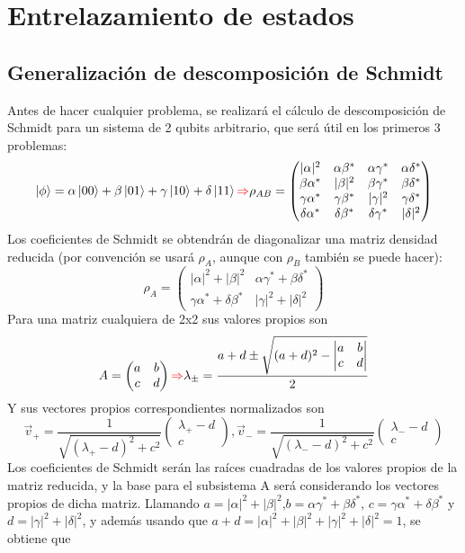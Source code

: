 \documentclass{book}
\begin{document}
\section{Entrelazamiento de estados}
\subsection{Generalización de descomposición de Schmidt}
Antes de hacer cualquier problema, se realizará el cálculo de descomposición de Schmidt para un sistema de 2 qubits arbitrario, que será útil en los primeros 3 problemas:
$$\ket{\phi}=\alpha\ket{00}+\beta\ket{01}+\gamma\ket{10}+\delta\ket{11}\textcolor{red}{\Rightarrow} \rho_{AB}=\begin{pmatrix}\lvert\alpha\rvert^2 &\alpha\beta^* &\alpha\gamma^*&\alpha\delta^*\\ \beta\alpha^*&\lvert\beta\rvert^2 &\beta\gamma^* &\beta\delta^*\\ \gamma\alpha^*&\gamma\beta^*&\lvert\gamma\rvert^2& \gamma\delta^*\\ \delta\alpha^*&\delta\beta^*&\delta\gamma^*& \lvert\delta\rvert^2 \end{pmatrix}$$
Los coeficientes de Schmidt se obtendrán de diagonalizar una matriz densidad reducida (por convención se usará $\rho_A$, aunque con $\rho_B$ también se puede hacer): 
$$\rho_A=\begin{pmatrix}\lvert\alpha\rvert^2+\lvert\beta\rvert^2 & \alpha\gamma^*+\beta\delta^*\\ \gamma\alpha^*+\delta\beta^* & \lvert\gamma\rvert^2+\lvert\delta\rvert^2\end{pmatrix}$$ 
Para una matriz cualquiera de 2x2 sus valores propios son
$$A=\begin{pmatrix} a&b\\c&d\end{pmatrix}\textcolor{red}{\Rightarrow} \lambda_\pm=\frac{a+d\pm\sqrt{(a+d)^2-\left|\begin{matrix}a &b\\c&d\end{matrix}\right|}}{2}$$ Y sus vectores propios correspondientes normalizados son
$$\vec{v}_+=\frac{1}{\sqrt{(\lambda_+-d)^2+c^2}}\begin{pmatrix} \lambda_+-d\\c\end{pmatrix}, \vec{v}_-=\frac{1}{\sqrt{(\lambda_--d)^2+c^2}}\begin{pmatrix} \lambda_--d\\c\end{pmatrix}$$ Los coeficientes de Schmidt serán las raíces cuadradas de los valores propios de la matriz reducida, y la base para el subsistema A será considerando los vectores propios de dicha matriz. Llamando $a=\lvert\alpha\rvert^2+\lvert\beta\rvert^2$,$b= \alpha\gamma^*+\beta\delta^*$, $c= \gamma\alpha^*+\delta\beta^*$ y $d=\lvert\gamma\rvert^2+\lvert\delta\rvert^2$, y además usando que $a+d=\lvert\alpha\rvert^2+\lvert\beta\rvert^2+\lvert\gamma\rvert^2+\lvert\delta\rvert^2=1$, se obtiene que
\end{document}
